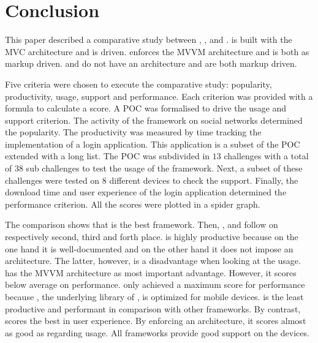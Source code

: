 \documentclass[a4paper]{artikel3}
\begin{document}

\section{Conclusion} %
\label{sec:conclusion}


This paper described a comparative study between \sta{},  \kendoa{},  \jqma{} and \lungo{}.
\sta{} is built with the MVC architecture and is \js{} driven.
\kendoa{} enforces the MVVM architecture and is both \js{} as markup driven.
\jqma{} and \lungo{} do not have an architecture and are both markup driven.

Five criteria were chosen to execute the comparative study:  popularity,  productivity,  usage,  support and performance.
Each criterion was provided with a formula to calculate a score.
A POC was formalised to drive the usage and support criterion.
The activity of the framework on social networks determined the popularity.
The productivity was measured by time tracking the implementation of a login application.
This application is a subset of the POC extended with a long list.
The POC was subdivided in $13$ challenges with a total of $38$ sub challenges to test the usage of the framework.
Next,  a subset of these challenges were tested on $8$ different devices to check the support.
Finally,  the download time and user experience of the login application determined the performance criterion.
All the scores were plotted in a spider graph.

The comparison shows that \jqma{} is the best framework.
Then, \kendoa{},  \lungo{} and \sta{} follow on respectively second, third and forth place.
\jqma{} is highly productive because on the one hand it is well-documented and on the other hand it does not impose an architecture.
The latter,  however,  is a disadvantage when looking at the usage.
\kendoa{} has the MVVM architecture as most important advantage.
However,  it scores below average on performance.
\lungo{} only achieved a maximum score for performance because \quo{},  the underlying \js{} library of \lungo{},  is optimized for mobile devices.
\sta{} is the least productive and performant in comparison with other frameworks.
By contrast,  \sta{} scores the best in user experience.
By enforcing an architecture,  it scores almost as good as \kendoa{} regarding usage.
All frameworks provide good support on the devices.
\end{document}
